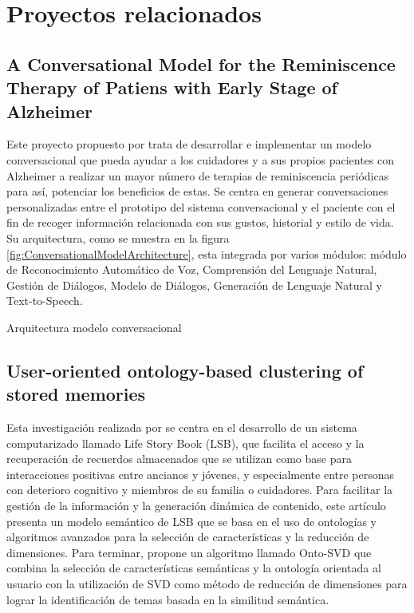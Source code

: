 \section{Proyectos relacionados}

\subsection{A Conversational Model for the Reminiscence Therapy of Patiens with Early Stage of Alzheimer}
Este proyecto propuesto por \cite{deconversational} trata de desarrollar e implementar un modelo conversacional que pueda ayudar a los cuidadores y a sus propios pacientes con Alzheimer a realizar un mayor número de terapias de reminiscencia periódicas para así, potenciar los beneficios de estas. Se centra en generar conversaciones personalizadas entre el prototipo del sistema conversacional y el paciente con el fin de recoger información relacionada con sus gustos, historial y estilo de vida. Su arquitectura, como se muestra en la figura \ref{fig:ConversationalModelArchitecture}, esta integrada por varios módulos: módulo de Reconocimiento Automático de Voz, Comprensión del Lenguaje Natural, Gestión de Diálogos, Modelo de Diálogos, Generación de Lenguaje Natural y Text-to-Speech.


%
{Arquitectura modelo conversacional \citep{deconversational}}

\subsection{User-oriented ontology-based clustering of stored memories}
Esta investigación realizada por \cite{shi2012user} se centra en el desarrollo de un sistema computarizado llamado Life Story Book (LSB), que facilita el acceso y la recuperación de recuerdos almacenados que se utilizan como base para interacciones positivas entre ancianos y jóvenes, y especialmente entre personas con deterioro cognitivo y miembros de su familia o cuidadores. Para facilitar la gestión de la información y la generación dinámica de contenido, este artículo presenta un modelo semántico de LSB que se basa en el uso de ontologías y algoritmos avanzados para la selección de características y la reducción de dimensiones. Para terminar, propone un algoritmo llamado Onto-SVD que combina la selección de características semánticas y la ontología orientada al usuario con  la utilización de SVD como método de reducción de dimensiones para lograr la identificación de temas basada en la similitud semántica.

